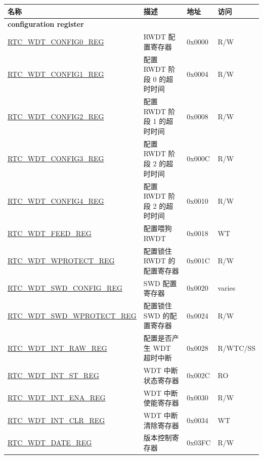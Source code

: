 \begin{longtable}{ | p{6cm} | p{7.2cm} | p{1.3cm} | p{1cm} | }
\hline\rowcolor{lightgray}
\textbf{名称 } & \textbf{描述} &  \textbf{地址} & \textbf{访问} \\ \hline
\endhead
\multicolumn{4}{|l|}{\textbf{configuration register}} \\ \hline
\hyperref[regdesc:RTCWDTCONFIG0REG]{RTC\_WDT\_CONFIG0\_REG} & RWDT 配置寄存器 & 0x0000 & R/W \\ \hline
\hyperref[regdesc:RTCWDTCONFIG1REG]{RTC\_WDT\_CONFIG1\_REG} & 配置 RWDT 阶段 0 的超时时间 & 0x0004 & R/W \\ \hline
\hyperref[regdesc:RTCWDTCONFIG2REG]{RTC\_WDT\_CONFIG2\_REG} & 配置 RWDT 阶段 1 的超时时间 & 0x0008 & R/W \\ \hline
\hyperref[regdesc:RTCWDTCONFIG3REG]{RTC\_WDT\_CONFIG3\_REG} & 配置 RWDT 阶段 2 的超时时间 & 0x000C & R/W \\ \hline
\hyperref[regdesc:RTCWDTCONFIG4REG]{RTC\_WDT\_CONFIG4\_REG} & 配置 RWDT 阶段 2 的超时时间 & 0x0010 & R/W \\ \hline
\hyperref[regdesc:RTCWDTFEEDREG]{RTC\_WDT\_FEED\_REG} & 配置喂狗 RWDT & 0x0018 & WT \\ \hline
\hyperref[regdesc:RTCWDTWPROTECTREG]{RTC\_WDT\_WPROTECT\_REG} & 配置锁住 RWDT 的配置寄存器 & 0x001C & R/W \\ \hline
\hyperref[regdesc:RTCWDTSWDCONFIGREG]{RTC\_WDT\_SWD\_CONFIG\_REG} & SWD 配置寄存器 & 0x0020 & varies \\ \hline
\hyperref[regdesc:RTCWDTSWDWPROTECTREG]{RTC\_WDT\_SWD\_WPROTECT\_REG} & 配置锁住 SWD 的配置寄存器 & 0x0024 & R/W \\ \hline
\hyperref[regdesc:RTCWDTINTRAWREG]{RTC\_WDT\_INT\_RAW\_REG} & 配置是否产生 WDT 超时中断 & 0x0028 & R/WTC/SS \\ \hline
\hyperref[regdesc:RTCWDTINTSTREG]{RTC\_WDT\_INT\_ST\_REG} & WDT 中断状态寄存器 & 0x002C & RO \\ \hline
\hyperref[regdesc:RTCWDTINTENAREG]{RTC\_WDT\_INT\_ENA\_REG} & WDT 中断使能寄存器 & 0x0030 & R/W \\ \hline
\hyperref[regdesc:RTCWDTINTCLRREG]{RTC\_WDT\_INT\_CLR\_REG} & WDT 中断清除寄存器 & 0x0034 & WT \\ \hline
\hyperref[regdesc:RTCWDTDATEREG]{RTC\_WDT\_DATE\_REG} & 版本控制寄存器 & 0x03FC & R/W \\ \hline
\end{longtable}

